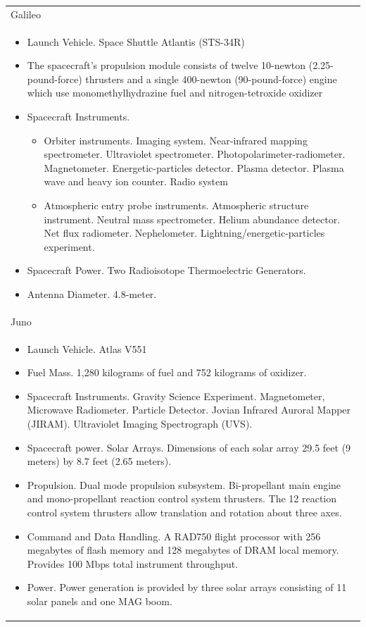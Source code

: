 \begin{supertabular}{p{\textwidth}}
  Galileo \\
  \begin{itemize}
  \item Launch Vehicle. Space Shuttle Atlantis (STS-34R)
  \item The spacecraft's propulsion module consists of twelve
    10-newton (2.25-pound-force) thrusters and a single 400-newton
    (90-pound-force) engine which use monomethylhydrazine fuel and
    nitrogen-tetroxide oxidizer
  \item Spacecraft Instruments.
    \begin{itemize}
    \item Orbiter instruments. Imaging system. Near-infrared mapping
      spectrometer. Ultraviolet spectrometer.
      Photopolarimeter-radiometer. Magnetometer. Energetic-particles
      detector. Plasma detector. Plasma wave and heavy ion
      counter. Radio system
    \item Atmospheric entry probe instruments. Atmospheric structure
      instrument.  Neutral mass spectrometer. Helium abundance
      detector. Net flux
      radiometer. Nephelometer. Lightning/energetic-particles
      experiment.
    \end{itemize}
  \item Spacecraft Power. Two Radioisotope Thermoelectric Generators.
  \item Antenna Diameter. 4.8-meter.
  \end{itemize} \\

  Juno \\
  \begin{itemize}
  \item Launch Vehicle. Atlas V551
  \item Fuel Mass. 1,280 kilograms of fuel and 752 kilograms of
    oxidizer.
  \item Spacecraft Instruments. Gravity Science Experiment.
    Magnetometer, Microwave Radiometer. Particle Detector. Jovian
    Infrared Auroral Mapper (JIRAM). Ultraviolet Imaging Spectrograph
    (UVS).
  \item Spacecraft power. Solar Arrays. Dimensions of each solar array
    29.5 feet (9 meters) by 8.7 feet (2.65 meters).
  \item Propulsion. Dual mode propulsion subsystem. Bi-propellant main
    engine and mono-propellant reaction control system thrusters. The
    12 reaction control system thrusters allow translation and
    rotation about three axes.
  \item Command and Data Handling. A RAD750 flight processor with 256
    megabytes of flash memory and 128 megabytes of DRAM local
    memory. Provides 100 Mbps total instrument throughput.
  \item Power. Power generation is provided by three solar arrays
    consisting of 11 solar panels and one MAG boom.
  \end{itemize} \\


\end{supertabular}
